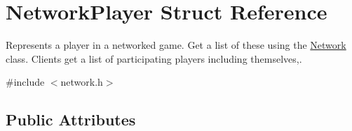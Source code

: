 \hypertarget{structNetworkPlayer}{
\section{\-Network\-Player \-Struct \-Reference}
\label{d4/dd8/structNetworkPlayer}
}


\-Represents a player in a networked game. \-Get a list of these using the \hyperlink{classNetwork}{\-Network} class. \-Clients get a list of participating players including themselves,.  




{\ttfamily \#include $<$network.\-h$>$}

\subsection*{\-Public \-Attributes}
